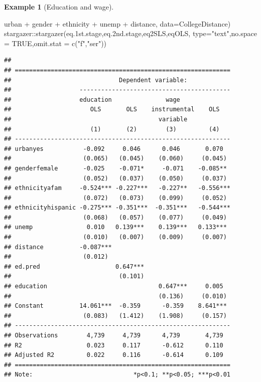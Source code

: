 \documentclass[
  12pt,
]{book}
\newenvironment{Shaded}{\begin{snugshade}}{\end{snugshade}}
\newcommand{\AttributeTok}[1]{\textcolor[rgb]{0.77,0.63,0.00}{#1}}
\newcommand{\ConstantTok}[1]{\textcolor[rgb]{0.00,0.00,0.00}{#1}}
\newcommand{\FloatTok}[1]{\textcolor[rgb]{0.00,0.00,0.81}{#1}}
\newcommand{\FunctionTok}[1]{\textcolor[rgb]{0.00,0.00,0.00}{#1}}
\newcommand{\NormalTok}[1]{#1}
\newcommand{\SpecialCharTok}[1]{\textcolor[rgb]{0.00,0.00,0.00}{#1}}
\newcommand{\StringTok}[1]{\textcolor[rgb]{0.31,0.60,0.02}{#1}}
\theoremstyle{definition}
\theoremstyle{definition}
\newtheorem{example}{Example}[chapter]
\theoremstyle{definition}
\theoremstyle{definition}
\theoremstyle{remark}
\begin{document}
\begin{example}[Education and wage]
\begin{Shaded}
\begin{Highlighting}[]
\NormalTok{                  urban }\SpecialCharTok{+}\NormalTok{ gender }\SpecialCharTok{+}\NormalTok{ ethnicity }\SpecialCharTok{+}\NormalTok{ unemp }\SpecialCharTok{+}\NormalTok{ distance,}
                \AttributeTok{data=}\NormalTok{CollegeDistance)}
\NormalTok{stargazer}\SpecialCharTok{::}\FunctionTok{stargazer}\NormalTok{(eq}\FloatTok{.1}\NormalTok{st.stage,eq}\FloatTok{.2}\NormalTok{nd.stage,eq2SLS,eqOLS,}
                     \AttributeTok{type=}\StringTok{"text"}\NormalTok{,}\AttributeTok{no.space =} \ConstantTok{TRUE}\NormalTok{,}\AttributeTok{omit.stat =} \FunctionTok{c}\NormalTok{(}\StringTok{"f"}\NormalTok{,}\StringTok{"ser"}\NormalTok{))}
\end{Highlighting}
\end{Shaded}

\begin{verbatim}
## 
## ============================================================
##                              Dependent variable:            
##                   ------------------------------------------
##                   education               wage              
##                      OLS       OLS    instrumental    OLS   
##                                         variable            
##                      (1)       (2)        (3)         (4)   
## ------------------------------------------------------------
## urbanyes           -0.092     0.046      0.046       0.070  
##                    (0.065)   (0.045)    (0.060)     (0.045) 
## genderfemale       -0.025    -0.071*     -0.071    -0.085** 
##                    (0.052)   (0.037)    (0.050)     (0.037) 
## ethnicityafam     -0.524*** -0.227***   -0.227**   -0.556***
##                    (0.072)   (0.073)    (0.099)     (0.052) 
## ethnicityhispanic -0.275*** -0.351***  -0.351***   -0.544***
##                    (0.068)   (0.057)    (0.077)     (0.049) 
## unemp               0.010   0.139***    0.139***   0.133*** 
##                    (0.010)   (0.007)    (0.009)     (0.007) 
## distance          -0.087***                                 
##                    (0.012)                                  
## ed.pred                     0.647***                        
##                              (0.101)                        
## education                               0.647***     0.005  
##                                         (0.136)     (0.010) 
## Constant          14.061***  -0.359      -0.359    8.641*** 
##                    (0.083)   (1.412)    (1.908)     (0.157) 
## ------------------------------------------------------------
## Observations        4,739     4,739      4,739       4,739  
## R2                  0.023     0.117      -0.612      0.110  
## Adjusted R2         0.022     0.116      -0.614      0.109  
## ============================================================
## Note:                            *p<0.1; **p<0.05; ***p<0.01
\end{verbatim}

\end{example}
\end{document}
